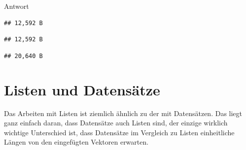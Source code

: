 \documentclass[
]{book}
\newenvironment{Shaded}{\begin{snugshade}}{\end{snugshade}}
\newcommand{\AttributeTok}[1]{\textcolor[rgb]{0.77,0.63,0.00}{#1}}
\newcommand{\DecValTok}[1]{\textcolor[rgb]{0.00,0.00,0.81}{#1}}
\newcommand{\FunctionTok}[1]{\textcolor[rgb]{0.00,0.00,0.00}{#1}}
\newcommand{\NormalTok}[1]{#1}
\newcommand{\OtherTok}[1]{\textcolor[rgb]{0.56,0.35,0.01}{#1}}
\newcommand{\SpecialCharTok}[1]{\textcolor[rgb]{0.00,0.00,0.00}{#1}}
\begin{document}
Antwort

\begin{Shaded}
\end{Shaded}

\begin{verbatim}
## 12,592 B
\end{verbatim}

\begin{Shaded}
\end{Shaded}

\begin{verbatim}
## 12,592 B
\end{verbatim}

\begin{Shaded}
\end{Shaded}

\begin{verbatim}
## 20,640 B
\end{verbatim}

\hypertarget{listen-und-datensuxe4tze}{%
\section{Listen und Datensätze}\label{listen-und-datensuxe4tze}}

Das Arbeiten mit Listen ist ziemlich ähnlich zu der mit Datensätzen.
Das liegt ganz einfach daran, dass Datensätze auch Listen sind, der einzige wirklich wichtige Unterschied ist, dass Datensätze im Vergleich zu Listen einheitliche Längen von den eingefügten Vektoren erwarten.
\end{document}
